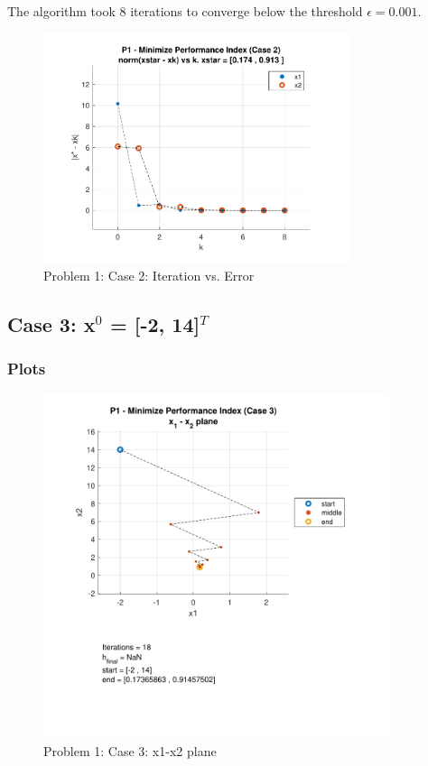 \documentclass[conf]{new-aiaa}
\begin{document}
The algorithm took 8 iterations to converge below the threshold $\epsilon = 0.001$. 

\begin{figure}[H]
	\begin{center}
		\includegraphics[width=0.8\textwidth]{P1 - Minimize Performance Index (Case 2) - norm(xstar - xk) vs k. xstar = [0.174 , 0.913 ].pdf}
	\end{center}
	\caption{Problem 1: Case 2: Iteration vs. Error}
\end{figure}

\subsection{Case 3: x$^0$ = [-2, 14]$^T$}

\subsubsection{Plots}

\begin{figure}[H]
	\begin{center}
		\includegraphics[width=0.9\textwidth]{P1 - Minimize Performance Index (Case 3) - x_1 - x_2 plane.pdf}
	\end{center}
	\caption{Problem 1: Case 3: x1-x2 plane}
\end{figure}
\end{document}
